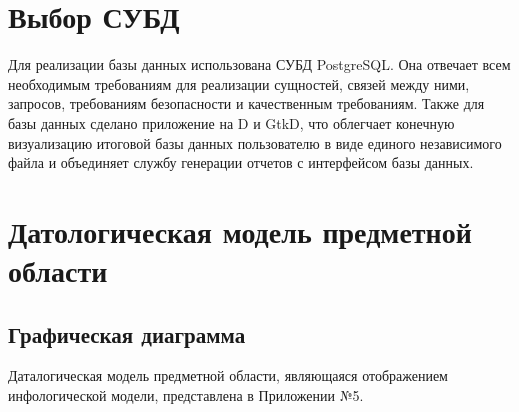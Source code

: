 \documentclass[russian,utf8,simple,emptystyle]{eskdtext}
\begin{document}
\section{Выбор СУБД}
Для реализации базы данных использована СУБД PostgreSQL. Она отвечает всем необходимым требованиям для реализации сущностей, связей между ними, запросов, требованиям безопасности и качественным требованиям. Также для базы данных сделано приложение на D и GtkD, что облегчает конечную визуализацию итоговой базы данных пользователю в виде единого независимого файла и объединяет службу генерации отчетов с интерфейсом базы данных.

\section{Датологическая модель предметной области}
\subsection{Графическая диаграмма}
Даталогическая модель предметной области, являющаяся отображением инфологической модели, представлена в Приложении №5.
\end{document}
